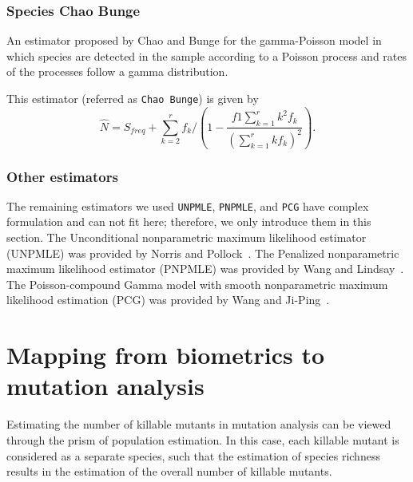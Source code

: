 \documentclass[sigconf,review,anonymous]{acmart}
\newcommand{\ChaoBunge}{Chao Bunge\xspace}
\newcounter{todocounter}
\newcommand{\todo}[1]{\marginpar{$|$}\textcolor{red}{\stepcounter{todocounter}\footnote[\thetodocounter]{\textcolor{red}{\textbf{TODO }}\textit{#1}}}}
\def\<#1>{\texttt{#1}}
\renewcommand{\todo}[1]{}
\begin{document}
\subsubsection{Species \ChaoBunge~\cite{chao2002estimating}}
An estimator proposed by Chao and Bunge for the gamma-Poisson model in which species are detected in the sample
according to a Poisson process and rates of the processes follow a gamma distribution.

This estimator (referred as \<\ChaoBunge>) %
is given by
\begin{displaymath}
  \hat{N} = S_{freq} + \sum_{k=2}^{r} f_k/(1 - \frac{f1 \sum_{k=1}^r k^2 f_{k}}{(\sum_{k=1}^r k f_{k})^2}).
\end{displaymath} %



\subsubsection{Other estimators}
The remaining estimators we used \<UNPMLE>, \<PNPMLE>, and \<PCG>
have complex formulation and can not fit here;
therefore, we only introduce them in this section.
%
The Unconditional nonparametric maximum likelihood estimator (UNPMLE)
was provided by Norris and Pollock~\cite{norris1998non}.
%
The Penalized nonparametric maximum likelihood estimator (PNPMLE)
was provided by Wang and Lindsay~\cite{wang2005penalized}.
%
The Poisson-compound Gamma model with smooth nonparametric maximum likelihood estimation (PCG)
was provided by Wang and Ji-Ping~\cite{wang2010estimating}.

\section{Mapping from biometrics to mutation analysis}
\label{sec:mapping}
Estimating the number of killable mutants in mutation analysis can be
viewed through the prism of population estimation. In this case,
each killable
mutant is considered as a separate species, such that the estimation of species richness
results in the estimation of the overall number of killable mutants.
\end{document}
